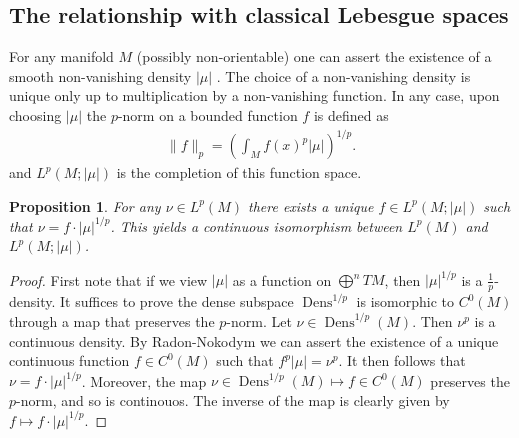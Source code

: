 \documentclass[12pt]{amsart}
\newtheorem{prop}[thm]{Proposition}
\DeclareMathOperator{\Dens}{Dens}
\begin{document}
\subsection{The relationship with classical Lebesgue spaces}
\label{sec:classical_Lebesgue}
For any manifold $M$ (possibly non-orientable) one can assert the existence of a smooth non-vanishing density $|\mu|$ .
The choice of a non-vanishing density is unique only up to multiplication by a non-vanishing function.
In any case, upon choosing $|\mu|$ the $p$-norm on a bounded function $f$ is defined as
\begin{align*}
	\| f \|_p =  \left( \int_M f(x)^p |\mu| \right)^{1/p}.
\end{align*}
and $L^p(M ; |\mu|)$ is the completion of this function space.

\begin{prop}
	For any $\nu \in L^p(M)$ there exists a unique $f \in L^p(M ; |\mu|)$ such that $\nu = f \cdot |\mu|^{1/p}$.
	This yields a continuous isomorphism between $L^p(M)$ and $L^p(M ; |\mu|)$.
\end{prop}
\begin{proof}
	First note that if we view $|\mu|$ as a function on $\bigoplus^n TM$, then $|\mu|^{1/p}$ is a $\frac{1}{p}$-density.
	It suffices to prove the dense subspace $\Dens^{1/p}$ is isomorphic to $C^0(M)$ through a map that preserves the $p$-norm.
	Let $\nu \in \Dens^{1/p}(M)$.  Then $\nu^p$ is a continuous density.
	By Radon-Nokodym we can assert the existence of a unique continuous function $f \in C^0(M)$ such that $f^{p} |\mu| = \nu^p$.
	It then follows that $\nu = f \cdot | \mu |^{1/p}$.
	Moreover, the map $\nu \in \Dens^{1/p}(M) \mapsto f \in C^0(M)$ preserves the $p$-norm, and so is continouos.
	The inverse of the map is clearly given by $f \mapsto f \cdot |\mu|^{1/p}$.
\end{proof}


\end{document}

